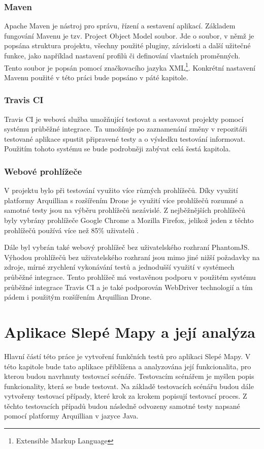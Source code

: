 \documentclass[
    color,   %
	table,   %
    twoside, %
]{fithesis3}
\begin{document}
\subsection{Maven}
Apache Maven \cite{Maven} je nástroj pro správu, řízení a sestavení aplikací. Základem fungování Mavenu je tzv. Project Object Model soubor. Jde o soubor, v němž je popsána struktura projektu, všechny použité pluginy, závislosti a další užitečné funkce, jako například nastavení profilů či definování vlastních proměnných. Tento soubor je popsán pomocí značkovacího jazyka XML\footnote{Extensible Markup Language}. Konkrétní nastavení Mavenu použité v této práci bude popsáno v páté kapitole.
\subsection{Travis CI}
Travis CI je webová služba umožňující testovat a sestavovat projekty pomocí systému průběžné integrace. Ta umožňuje po zaznamenání změny v repozitáři testované aplikace spustit připravené testy a o výsledku testování informovat. Použitím tohoto systému se bude podrobněji zabývat celá šestá kapitola.
\subsection{Webové prohlížeče}
V projektu bylo při testování využito více různých prohlížečů. Díky využití platformy Arquillian s rozšířením Drone je využití více prohlížečů rozumné a samotné testy jsou na výběru prohlížečů nezávislé. Z nejběžnějších prohlížečů byly vybrány prohlížeče Google Chrome a Mozilla Firefox, jelikož jeden z těchto prohlížečů používá více než 85\% uživatelů \cite{Browsers}.

Dále byl vybrán také webový prohlížeč bez uživatelského rozhraní PhantomJS. Výhodou prohlížečů bez uživatelského rozhraní jsou mimo jiné nižší požadavky na zdroje, mírné zrychlení vykonávání testů a jednodušší využití v systémech průběžné integrace. Tento prohlížeč má vestavěnou podporu v použitém systému průběžné integrace Travis CI a je také podporován WebDriver technologií a tím pádem i použitým rozšířením Arquillian Drone.

\chapter{Aplikace Slepé Mapy a její analýza}
Hlavní částí této práce je vytvoření funkčních testů pro aplikaci Slepé Mapy. V této kapitole bude tato aplikace přiblížena a analyzována její funkcionalita, pro kterou  budou navrhnuty testovací scénáře. Testovacím scénářem je myšlen popis funkcionality, která se bude testovat. Na základě testovacích scénářu budou dále vytvořeny testovací případy, které krok za krokem popisují testovací proces. Z těchto testovacích případů budou následně odvozeny samotné testy napsané pomocí platformy Arquillian v jazyce Java.
\end{document}
